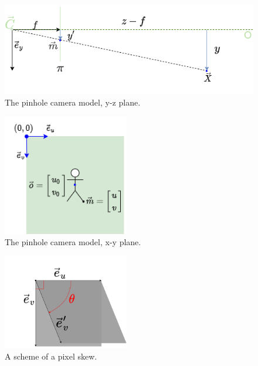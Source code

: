 \begin{figure}[ht]
    \centering
    \includegraphics[width=\textwidth]{graphics/td_scene_yz.png}
    \caption{The pinhole camera model, y-z plane.}
    \label{fig:td_scene_yz}
\end{figure}

\begin{figure}[ht]
  \centering
  \includegraphics[width=0.49\textwidth]{graphics/td_scene_xy.png}
  \caption{The pinhole camera model, x-y plane.}
  \label{fig:td_scene_xy}
\end{figure}

\begin{figure}[ht]
  \centering
  \includegraphics[width=0.49\textwidth]{graphics/pixel.png}
  \caption{A scheme of a pixel skew.}
  \label{fig:Kframes}
\end{figure}

